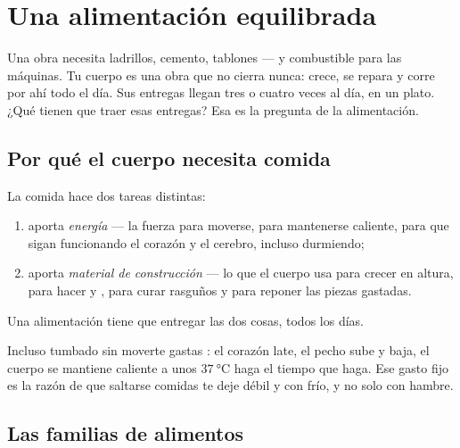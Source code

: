 \chapter{Una alimentación equilibrada}\label{ch:g3:balanced-diet}

Una obra necesita ladrillos, cemento, tablones --- y combustible para
las máquinas. Tu cuerpo es una obra que no cierra nunca: crece, se
repara y corre por ahí todo el día. Sus entregas llegan tres o cuatro
veces al día, en un plato. ¿Qué tienen que traer esas entregas? Esa es
la pregunta de la alimentación.

\section{Por qué el cuerpo necesita comida}

\begin{proposition}\label{prop:g3:balanced-diet:jobs}
La comida hace dos tareas distintas:
\begin{enumerate}
  \item aporta \emph{energía} ---
        la fuerza para moverse, para mantenerse caliente, para que
        sigan funcionando el corazón y el cerebro, incluso durmiendo;
  \item aporta \emph{material de construcción} --- lo que el cuerpo
        usa para crecer en altura, para hacer  y , para
        curar rasguños y para reponer las piezas gastadas.
\end{enumerate}
Una alimentación tiene que entregar las dos cosas, todos los días.
\end{proposition}
\admitted

\begin{example}\label{ex:g3:balanced-diet:rest}
Incluso tumbado sin moverte gastas : el corazón late, el pecho
sube y baja, el cuerpo se mantiene caliente a unos
$\qty{37}{\degreeCelsius}$ haga el tiempo que haga. Ese gasto fijo es
la razón de que saltarse comidas te deje débil y con frío, y no solo
con hambre.
\end{example}

\section{Las familias de alimentos}

